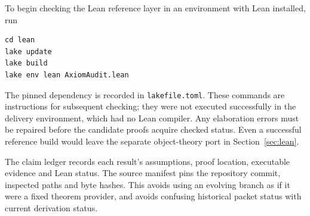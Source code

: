 To begin checking the Lean reference layer in an environment with Lean installed, run
\begin{lstlisting}
cd lean
lake update
lake build
lake env lean AxiomAudit.lean
\end{lstlisting}
The pinned dependency is recorded in \nolinkurl{lakefile.toml}. These commands are instructions for subsequent checking; they were not executed successfully in the delivery environment, which had no Lean compiler. Any elaboration errors must be repaired before the candidate proofs acquire checked status. Even a successful reference build would leave the separate object-theory port in Section~\ref{sec:lean}.

The claim ledger records each result's assumptions, proof location, executable evidence and Lean status. The source manifest pins the repository commit, inspected paths and byte hashes. This avoids using an evolving branch as if it were a fixed theorem provider, and avoids confusing historical packet status with current derivation status.
